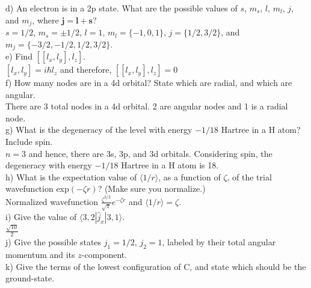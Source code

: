 \documentclass{article}
\begin{document}
\noindent d) An electron is in a 2p state. What are the possible values of $s$, $m_s$, $l$,
$m_l$, $j$, and $m_j$, where $\mathbf{j} = \mathbf{l} + \mathbf{s}$?
\\

{\color{blue} $s=1/2$, $m_s=\pm 1/2$, $l=1$, $m_l=\{-1,0,1\}$, $j=\{1/2,3/2\}$, and
  $m_j = \{-3/2,-1/2,1/2,3/2\}$.
}
\\

\noindent e) Find $[[l_x,l_y],l_z]$.
\\

{\color{blue}
  $[l_x,l_y] = i\hbar l_z$ and therefore, $[[l_x,l_y],l_z] = 0$
}
\\

\noindent f) How many nodes are in a 4d orbital? State which are radial, and which are
angular.
\\

{\color{blue} There are 3 total nodes in a 4d orbital. 2 are angular nodes and 1 is a
  radial node.
}
\\

\noindent g) What is the degeneracy of the level with energy $-1/18$ Hartree in a H
atom? Include spin.
\\

{\color{blue} $n=3$ and hence, there are 3s, 3p, and 3d orbitals. Considering spin,
  the degeneracy with energy $-1/18$ Hartree in a H atom is
  18.}
\\

\noindent h) What is the expectation value of $\langle 1/r \rangle$, as a function of
$\zeta$, of the trial wavefunction exp$(-\zeta r)$? (Make sure you normalize.)
\\

{\color{blue} Normalized wavefunction $\frac{\zeta^{3/2}}{\sqrt{\pi}}e^{-\zeta r}$
  and $\langle 1/r \rangle = \zeta$.
}
\\

\noindent i) Give the value of $\langle 3,2|\hat{j}_x|3,1\rangle$.
\\

{\color{blue} $\frac{\sqrt{10}}{2}$}
\\

\noindent j) Give the possible states $j_1 = 1/2$, $j_2 = 1$, labeled by their total
angular momentum and its $z$-component.
\\

\noindent k) Give the terms of the lowest configuration of C, and state which should
be the ground-state.
\\
\end{document}
